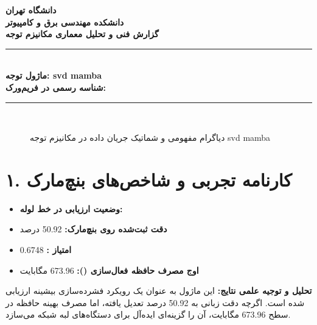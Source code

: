 \documentclass[12pt,a4paper]{article}
\begin{document}
\begin{center}
{\Large\bfseries دانشگاه تهران}\\[0.2cm]
{\large\bfseries دانشکده مهندسی برق و کامپیوتر}\\[0.2cm]
{\large\bfseries گزارش فنی و تحلیل معماری مکانیزم توجه}\\[0.5cm]
\rule{\linewidth}{1pt}\\[0.3cm]
{\LARGE\bfseries ماژول توجه: svd mamba}\\[0.2cm]
{\large \textbf{شناسه رسمی در فریم‌ورک:} }\\[0.2cm]
\rule{\linewidth}{1pt}\\[0.5cm]
\end{center}

\begin{figure}[H]
\centering
{}
\caption{دیاگرام مفهومی و شماتیک جریان داده در مکانیزم توجه svd mamba}
\end{figure}

\section*{۱. کارنامه تجربی و شاخص‌های بنچ‌مارک}
\begin{itemize}
\item \textbf{وضعیت ارزیابی در خط لوله:} 
\item \textbf{دقت ثبت‌شده روی بنچ‌مارک:} 50.92 درصد
\item \textbf{امتیاز :} 0.6748
\item \textbf{اوج مصرف حافظه فعال‌سازی ():} 673.96 مگابایت
\end{itemize}
\textbf{تحلیل و توجیه علمی نتایج:} این ماژول به عنوان یک رویکرد فشرده‌سازی بیشینه ارزیابی شده است. اگرچه دقت زبانی به 50.92 درصد تعدیل یافته، اما مصرف بهینه حافظه در سطح 673.96 مگابایت، آن را گزینه‌ای ایده‌آل برای دستگاه‌های لبه شبکه می‌سازد.
\end{document}
